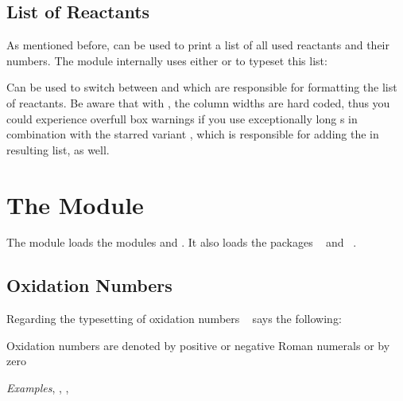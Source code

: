 \documentclass{chemmacros-manual}
\begin{document}
\begin{example}
  \par
  \par
\end{example}

\subsection{List of Reactants}\label{sec:list-of-reactants}
As mentioned before,  can be used to print a list of all
used reactants and their numbers. The  module internally
uses either  or  to typeset this list:
\begin{options}
    Can be used to switch between  and  which
    are responsible for formatting the list of reactants. Be aware that with
    , the column widths are hard coded, thus you could
    experience overfull box warnings if you use exceptionally long s
    in combination with the starred variant , which is
    responsible for adding the  in resulting list, as well.
\end{options}

\section{The  Module}\label{sec:redox-module}

The  module loads the modules  and
. It also loads the packages
~\cite{pkg:mathtools} and ~\cite{pkg:relsize}.

\subsection{Oxidation Numbers}\label{sec:oxidation-numbers}

Regarding the typesetting of oxidation numbers
~\cite{iupac:greenbook} says the following:
\begin{cnltxquote}
  Oxidation numbers are denoted by positive or negative Roman numerals or by
  zero \textelp{}

  \textit{Examples}\quad {}, , ,
\end{cnltxquote}
\end{document}
